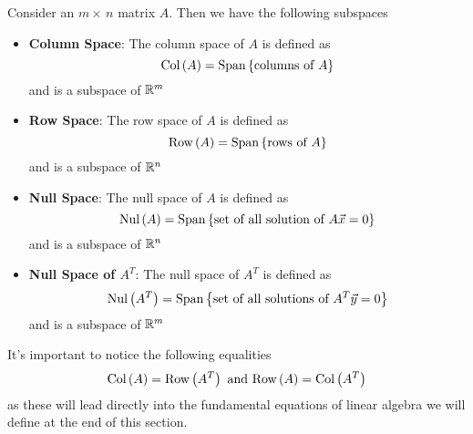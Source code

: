 \begin{impbox}{}{}
    Consider an $m\times\,n$ matrix $A$. Then we have the following subspaces 
    \begin{itemize}
        \item \textbf{Column Space}: The column space of $A$ is defined as \[\text{Col}\left(A\right) = \text{Span}\left\{\text{columns of } A \right\}\] and is a subspace of $\mathbb R^{m}$
        \item \textbf{Row Space}: The row space of $A$ is defined as \[\text{Row}\left(A\right) = \text{Span}\left\{\text{rows of } A \right\}\] and is a subspace of $\mathbb R^{n}$
        \item \textbf{Null Space}: The null space of $A$ is defined as \[\text{Nul}\left(A\right) = \text{Span}\left\{\text{set of all solution of } A\vec{x} = 0 \right\}\] and is a subspace of $\mathbb R^{n}$
        \item \textbf{Null Space of $A^{T}$}: The null space of $A^{T}$ is defined as \[\text{Nul}\left(A^T\right) = \text{Span}\left\{\text{set of all solutions of } A^{T}\vec{y}=0 \right\}\] and is a subspace of $\mathbb R^{m}$
    \end{itemize}
\end{impbox}

It's important to notice the following equalities 
\[
    \text{Col}\left(A\right) = \text{Row}\left(A^{T}\right) \text{ and } \text{Row}\left(A\right) = \text{Col}\left(A^{T}\right)
\]
as these will lead directly into the fundamental equations of linear algebra we will define at the end of this section.

